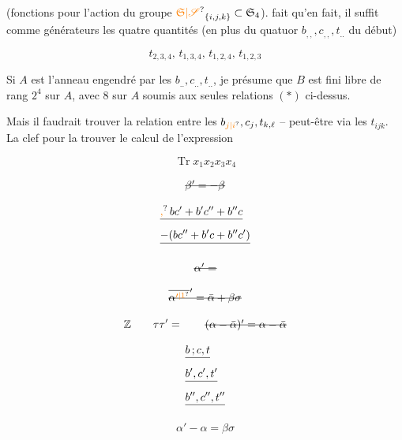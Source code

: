 
(fonctions   pour l'action du groupe $\unsure{\mathfrak S|\mathscr S}_{\{i,j,k\}}\subset\mathfrak S_4$).  fait qu'en fait, il suffit comme générateurs les quatre quantités (en plus du quatuor $b_{,,},c_{,,},t_{..}$ du début)

\[
 t_{2,3,4},\,t_{1,3,4},\,t_{1,2,4},\,t_{1,2,3}
\]

Si $A$ est l'anneau engendré par les $b_{..},c_{..},t_{..}$, je présume que $B$ est fini libre de rang $2^4$ sur $A$, avec $8$   sur $A$ soumis aux seules relations $(\ast)$ ci-dessus.

Mais il faudrait trouver la relation entre les $b_{\unsure{j|i}},c_j,t_{k,\ell}$ -- peut-être via les $t_{ijk}$. La clef pour la trouver   le calcul de l'expression

\[
 \operatorname{Tr} x_1x_2x_3x_4
\]

\deleted{\unsure{,}}

\[
 \deleted{\beta'=-\beta}
\]

\[
 \begin{aligned}
 &\deleted{\unsure{,}\,bc'+b'c''+b''c}\\
 &\deleted{-(bc''+b'c+b''c')}
 \end{aligned}
\]

\[
 \deleted{\alpha'=}
\]

\[
 \deleted{\overline{\alpha^{\unsure{\prime|1}}}'=\bar\alpha+\beta\sigma}
\]

\[
 \mathbb Z \qquad \tau\tau'= \qquad \deleted{(\alpha-\bar\alpha)'=\alpha-\bar\alpha}
\]

\[
 \begin{aligned}
 &\deleted{b\,;c,t}\\
 &\deleted{b',c',t'}\\
 &\deleted{b'',c'',t''}
 \end{aligned}
\]

\[
 \alpha'-\alpha=\beta\sigma
\]


